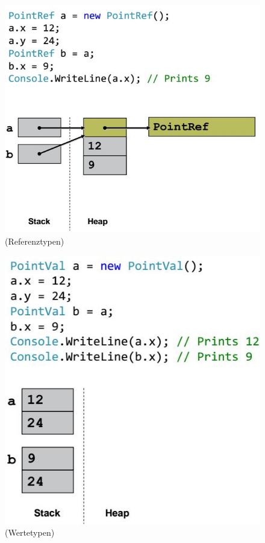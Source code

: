 \documentclass[
a4paper,
oneside,
10pt,
fleqn,
headsepline,
toc=listofnumbered, 
bibliography=totocnumbered]{scrartcl}
\begin{document}
\begin{figure}[ht!]
	\centering
	\begin{minipage}[t]{0.4\textwidth}
		\centering
		\includegraphics[width=0.8\linewidth]{images/reference_types}
		(Referenztypen)
		\label{fig:searchtreeinsert1}
	\end{minipage}
	\begin{minipage}[t]{0.4\textwidth}
		\centering
		\includegraphics[width=0.8\linewidth]{images/value_types}
		(Wertetypen)
		\label{fig:searchtreeinsert2}
	\end{minipage}
\end{figure}
\end{document}
